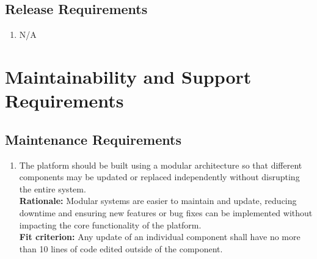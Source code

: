 \documentclass[12pt]{article}
\begin{document}
\subsection{Release Requirements}
\begin{enumerate}[{OE-RR}1. ]
  \item N/A
\end{enumerate}

\section{Maintainability and Support Requirements}
\subsection{Maintenance Requirements}
\begin{enumerate}[{MS-MR}1. ]
  \item The platform should be built using a modular architecture so that different components may be updated or replaced independently without disrupting the entire system.\\
  \textbf{Rationale: }Modular systems are easier to maintain and update, reducing downtime and ensuring new features or bug fixes can be implemented without impacting the core functionality of the platform.\\
  \textbf{Fit criterion: }Any update of an individual component shall have no more than 10 lines of code edited outside of the component.
\end{enumerate}
\end{document}
